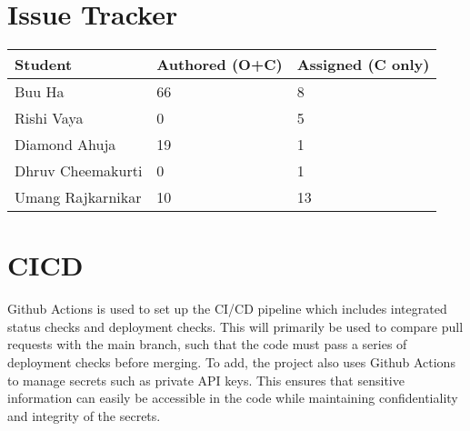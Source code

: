 \documentclass{article}
\begin{document}
\section{Issue Tracker}

\begin{table}[H]
\centering
\begin{tabular}{lll}
\toprule
\textbf{Student} & \textbf{Authored (O+C)} & \textbf{Assigned (C only)}\\
\midrule
Buu Ha & 66 & 8 \\
Rishi Vaya & 0 & 5 \\
Diamond Ahuja & 19 & 1 \\
Dhruv Cheemakurti & 0 & 1 \\
Umang Rajkarnikar & 10 & 13 \\
\bottomrule
\end{tabular}
\end{table}

\section{CICD}

Github Actions is used to set up the CI/CD pipeline which includes integrated status checks and deployment checks. This will primarily be used to compare pull requests with the main branch, such that the code must pass a series of deployment checks before merging. To add, the project
also uses Github Actions to manage secrets such as private API keys. This ensures that sensitive information can easily be accessible in the code while maintaining
confidentiality and integrity of the secrets.
\end{document}
